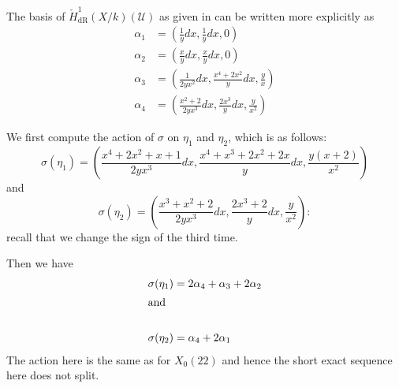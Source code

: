 \documentclass[draft, 11pt]{article} %
\theoremstyle{plain}
\theoremstyle{remark}
\newcommand{\cU}{{\mathcal U}}
\newcommand{\cechderhamhone}{\check{H}_{\text {dR}}^1(X/k)}
\begin{document}
The basis of $\cechderhamhone (\cU)$ as given in \cite{derhamactions} can be written more explicitly as 
\begin{align*}
\alpha_1 & = \left( \frac{1}{y}dx, \frac{1}{y}dx, 0 \right) \\
\alpha_2 & = \left( \frac{x}{y}dx, \frac{x}{y}dx, 0 \right) \\
\alpha_3 & = \left( \frac{1}{2yx^2}dx, \frac{x^4 + 2x^2}{y}dx, \frac{y}{x} \right) \\
\alpha_4 & = \left( \frac{x^2 + 2}{2yx^3}dx, \frac{2x^3}{y}dx, \frac{y}{x^2} \right)
\end{align*}

We first compute the action of $\sigma$ on $\eta_1$ and $\eta_2$, which is as follows:
\[
\sigma(\eta_1) = \left( \frac{x^4 + 2x^2 + x +1}{2yx^3}dx, \frac{x^4 + x^3 + 2x^2 + 2x}{y}dx, \frac{y(x+2)}{x^2} \right) 
\]
and
\[
\sigma(\eta_2) = \left( \frac{x^3 + x^2 +2}{2yx^3}dx, \frac{2x^3 + 2}{y}dx, \frac{y}{x^2} \right):
\]
recall that we change the sign of the third time.

Then we have
\begin{align*}
\sigma(\eta_1) &= 2\alpha_4 + \alpha_3 + 2\alpha_2\\
\intertext{and}\\
\sigma(\eta_2) & = \alpha_4 + 2\alpha_1
\end{align*}
The action here is the same as for $X_0(22)$ and hence the short exact sequence here does not split.





\end{document}

